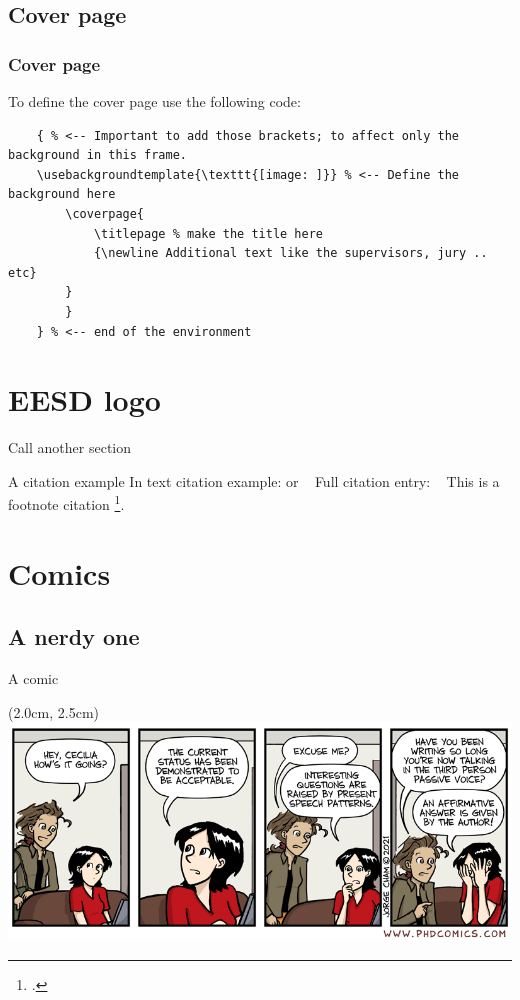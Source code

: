 \documentclass[editmode]{EPFL_BEAMER}
\begin{document}
\subsection{Cover page}
\begin{frame}[fragile]
\frametitle{Cover page}
    To define the cover page use the following code:
    \vspace{10pt}
    \begin{lstlisting}
    { % <-- Important to add those brackets; to affect only the background in this frame.
    \usebackgroundtemplate{\texttt{[image: ]}} % <-- Define the background here
        \coverpage{
            \titlepage % make the title here
            {\newline Additional text like the supervisors, jury .. etc}
        }
        }
    } % <-- end of the environment
    \end{lstlisting}
    \vspace{10pt}
\end{frame}

\section{EESD logo}


\begin{frame}{Call another section}
    
\end{frame}

\begin{frame}{A citation example}
    In text citation example: \cite{SHAQFA2022} or \citep{SHAQFA2022}
    \newline~\newline
    Full citation entry: 
    \newline~\newline
    This is a footnote citation \footcite{SHAQFA2022}.
\end{frame}

\section{Comics}
\subsection{A nerdy one}
\begin{frame}{A comic}
    \begin{textblock*}{13cm}(2.0cm, 2.5cm)
        \includegraphics[width=1.0\textwidth]{phd102221s.png}
    \end{textblock*}
\end{frame}
\end{document}
